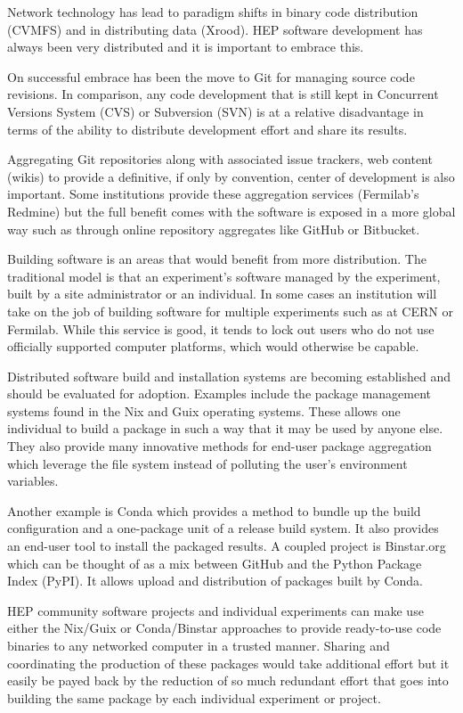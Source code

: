 Network technology has lead to paradigm shifts in binary code
distribution (CVMFS) and in distributing data (Xrood).  HEP software
development has always been very distributed and it is important to
embrace this.

On successful embrace has been the move to Git for managing source
code revisions.  In comparison, any code development that is still
kept in Concurrent Versions System (CVS) or Subversion (SVN) is at a
relative disadvantage in terms of the ability to distribute
development effort and share its results.

Aggregating Git repositories along with associated issue trackers, web
content (wikis) to provide a definitive, if only by convention, center
of development is also important.  Some institutions provide these
aggregation services (Fermilab's Redmine) but the full benefit comes
with the software is exposed in a more global way such as through
online repository aggregates like GitHub or Bitbucket.

Building software is an areas that would benefit from more
distribution.  The traditional model is that an experiment's software
managed by the experiment, built by a site administrator or an
individual.  In some cases an institution will take on the job of
building software for multiple experiments such as at CERN or
Fermilab.  While this service is good, it tends to lock out users who
do not use officially supported computer platforms, which would
otherwise be capable.  

Distributed software build and installation systems are becoming
established and should be evaluated for adoption.  Examples include
the package management systems found in the Nix and Guix operating
systems.  These allows one individual to build a package in such a way
that it may be used by anyone else.  They also provide many innovative
methods for end-user package aggregation which leverage the file
system instead of polluting the user's environment variables.

Another example is Conda which provides a method to bundle up the
build configuration and a one-package unit of a release build system.
It also provides an end-user tool to install the packaged results.  A
coupled project is Binstar.org which can be thought of as a mix
between GitHub and the Python Package Index (PyPI).  It allows upload
and distribution of packages built by Conda.  

HEP community software projects and individual experiments can make
use either the Nix/Guix or Conda/Binstar approaches to provide
ready-to-use code binaries to any networked computer in a trusted
manner.
%
Sharing and coordinating the production of these packages would take
additional effort but it easily be payed back by the reduction of so
much redundant effort that goes into building the same package by each
individual experiment or project.


